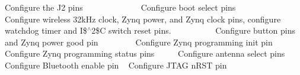 Configure the J2 pins ~\newline
~\newline
~\newline
~\newline
~\newline
~\newline
~\newline
~\newline
 Configure boot select pins ~\newline
~\newline
~\newline
~\newline
~\newline
~\newline
~\newline
 Configure wireless 32k\+Hz clock, Zynq power, and Zynq clock pins, configure watchdog timer and I\$$^\wedge$2\$C switch reset pins. ~\newline
~\newline
~\newline
~\newline
~\newline
~\newline
 Configure button pins and Zynq power good pin ~\newline
~\newline
~\newline
~\newline
~\newline
 Configure Zynq programming init pin ~\newline
~\newline
~\newline
~\newline
 Configure Zynq programming status pins ~\newline
~\newline
~\newline
 Configure antenna select pins ~\newline
~\newline
 Configure Bluetooth enable pin ~\newline
 Configure J\+T\+AG n\+R\+ST pin 
